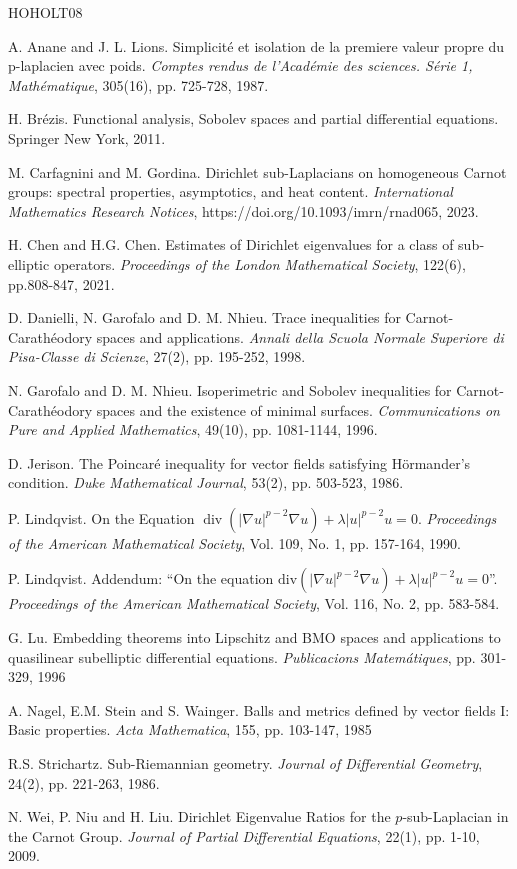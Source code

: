\documentclass[a4paper,12pt,reqno]{amsart}
\numberwithin{equation}{section}
\theoremstyle{plain}
\theoremstyle{definition}
\begin{document}
\begin{thebibliography}{HOHOLT08}




A. Anane  and J. L. Lions. Simplicité et isolation de la premiere valeur propre du p-laplacien avec poids. {\em Comptes rendus de l'Académie des sciences. Série 1, Mathématique}, 305(16), pp. 725-728, 1987.

H. Brézis. Functional analysis, Sobolev spaces and partial differential equations.  Springer New York, 2011.

M. Carfagnini and M. Gordina. Dirichlet sub-Laplacians on homogeneous Carnot groups: spectral properties, asymptotics, and heat content. {\em International Mathematics Research Notices}, https://doi.org/10.1093/imrn/rnad065, 2023.

H. Chen and H.G. Chen. Estimates of Dirichlet eigenvalues for a class of sub‐elliptic operators. {\em Proceedings of the London Mathematical Society}, 122(6), pp.808-847, 2021.

D. Danielli, N. Garofalo and D. M. Nhieu. Trace inequalities for Carnot-Carathéodory spaces and applications. {\em Annali della Scuola Normale Superiore di Pisa-Classe di Scienze}, 27(2), pp. 195-252, 1998.


N. Garofalo and D. M. Nhieu.  Isoperimetric and Sobolev inequalities for Carnot‐Carathéodory spaces and the existence of minimal surfaces. {\em Communications on Pure and Applied Mathematics}, 49(10), pp. 1081-1144, 1996.

D. Jerison. The Poincaré inequality for vector fields satisfying Hörmander’s condition. {\em Duke Mathematical Journal}, 53(2), pp. 503-523, 1986.

P. Lindqvist.
On the Equation $\operatorname{div}(|\nabla u|^{p-2}\nabla u) + \lambda|u| ^{p-2}u = 0$.
{\em Proceedings of the American Mathematical Society}, Vol. 109, No. 1, pp. 157-164, 1990.

P. Lindqvist.
Addendum: “On the equation $\textrm {div}(\vert \nabla u\vert ^ {p-2}\nabla u)+\lambda \vert u\vert ^ {p-2}u=0$”. {\em Proceedings of the American Mathematical Society}, Vol. 116, No. 2, pp. 583-584. 

G. Lu. Embedding theorems into Lipschitz and BMO spaces and applications to quasilinear subelliptic differential equations. {\em Publicacions Matemátiques}, pp. 301-329, 1996

A. Nagel, E.M. Stein and S. Wainger. Balls and metrics defined by vector fields I: Basic properties. {\em Acta Mathematica}, 155, pp. 103-147, 1985





R.S. Strichartz. Sub-Riemannian geometry. {\em Journal of Differential Geometry}, 24(2), pp. 221-263, 1986.


N. Wei, P. Niu and H. Liu. Dirichlet Eigenvalue Ratios for the $p$-sub-Laplacian in the Carnot Group. {\em Journal of Partial Differential Equations}, 22(1), pp. 1-10, 2009.
\end{thebibliography}
\end{document}
